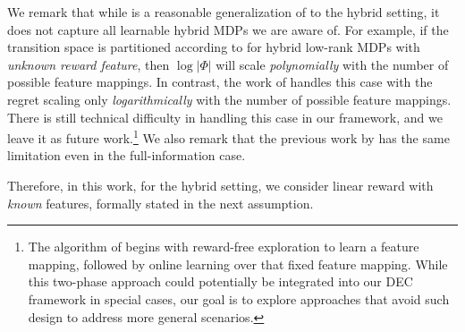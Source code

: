 We remark that while  is a reasonable generalization of  to the hybrid setting, it does not capture all learnable hybrid MDPs we are aware of. For example, if the transition space is partitioned according to  for hybrid low-rank MDPs with \emph{unknown reward feature}, then $\log|\Phi|$ will scale \emph{polynomially} with the number of possible feature mappings. In contrast, the work of \cite{liu2024beating} handles this case with the regret scaling only \emph{logarithmically} with the number of possible feature mappings. There is still technical difficulty in handling this case in our framework, and we leave it as future work.\footnote{The algorithm of \cite{liu2024beating} begins with reward-free exploration to learn a feature mapping, followed by online learning over that fixed feature mapping. While this two-phase approach could potentially be integrated into our DEC framework in special cases, our goal is to explore approaches that avoid such design to address more general scenarios.} We also remark that the previous work by \cite{liu2025decision} has the same limitation even in the full-information case. 

Therefore, in this work, for the hybrid setting, we consider linear reward with \emph{known} features, formally stated in the next assumption. 



